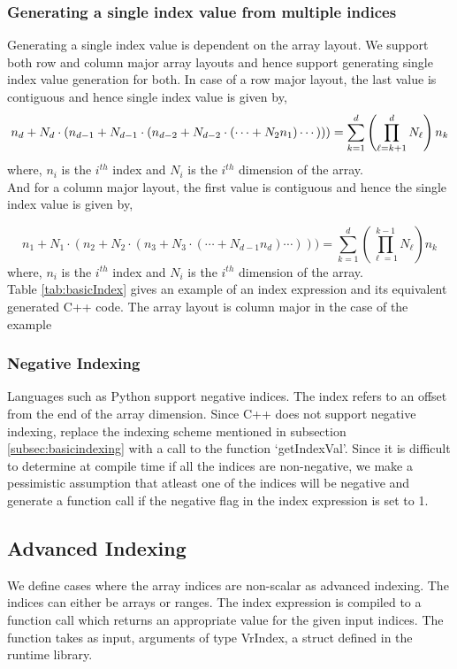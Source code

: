 \subsubsection{ Generating a single index value from multiple indices}
Generating a single index value is dependent on the array layout. We support both row and column major array layouts and hence support generating single index value generation for both. In case of a row major layout, the last value is contiguous and hence single index value is given by,
\begin{equation}
n_d + N_d \cdot (n_{d-1} + N_{d-1} \cdot (n_{d-2} + N_{d-2} \cdot (\cdots + N_2 n_1)\cdots)))
= \sum_{k=1}^d \left( \prod_{\ell=k+1}^d N_\ell \right) n_k \\
\end{equation} 
 where, $n_i$ is the $i^{th}$ index and  $N_i$ is the $i^{th}$ dimension of the array. \\
And for a column major  layout, the first value is contiguous and hence the single index value is given by,

\begin{equation}
n_1 + N_1 \cdot (n_2 + N_2 \cdot (n_3 + N_3 \cdot (\cdots + N_{d-1} n_d)\cdots)))
= \sum_{k=1}^d \left( \prod_{\ell=1}^{k-1} N_\ell \right) n_k
\end{equation} 
 where, $n_i$ is the $ i^{th}$ index and  $N_i$ is the $i^{th}$ dimension of the array. \\
Table \ref{tab:basicIndex} gives an example of an index expression and its equivalent generated C++ code. The array layout is column major in the case of the example
\subsubsection{Negative Indexing}
Languages such as Python support negative indices. The index refers to an offset from the end of the array dimension. Since C++ does not support negative indexing, replace the indexing scheme mentioned in subsection \ref{subsec:basicindexing} with a call to the function `getIndexVal'. Since it is difficult to determine at compile time if all the indices are non-negative, we make a pessimistic assumption that atleast one of the indices will be negative and generate a function call if the negative flag in the index expression is set to 1.
\subsection{Advanced Indexing}
\label{subsec:advancedindexing}
We define cases where the array indices are non-scalar as advanced indexing. The indices can either be arrays or ranges. The index expression is compiled to a function call which returns an appropriate value for the given input indices. The function takes as input, arguments of type VrIndex, a struct defined in the runtime library.
